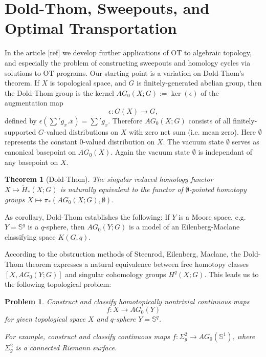 \documentclass[12pt]{amsart}
\newtheorem*{thm}{Theorem}
\newtheorem{prob}{Problem}
\theoremstyle{definition}
\theoremstyle{remark}
\begin{document}


\section{Dold-Thom, Sweepouts, and Optimal Transportation}
In the article [ref] we develop further applications of OT to algebraic topology, and especially the problem of constructing sweepouts and homology cycles via solutions to OT programs. Our starting point is a variation on Dold-Thom's theorem. If $X$ is topological space, and $G$ is finitely-generated abelian group, then the Dold-Thom group is the kernel $AG_0(X;G):=\ker(\epsilon)$ of the augmentation map $$\epsilon: G(X) \to G,$$ defined by $\epsilon(\sum' g_x .x)=\sum' g_x$. Therefore $AG_0(X;G)$ consists of all finitely-supported $G$-valued distributions on $X$ with zero net sum (i.e. mean zero). Here $\emptyset$ represents the constant $0$-valued distribution on $X$. The vacuum state $\emptyset$ serves as canonical basepoint on $AG_0(X)$. Again the vacuum state $\emptyset$ is independant of any basepoint on $X$. 

\begin{thm}[Dold-Thom]
The singular reduced homology functor $X\mapsto \tilde{H}_*(X;G)$ is naturally equivalent to the functor of $\emptyset$-pointed homotopy groups $X\mapsto \pi_*(AG_0(X;G), \emptyset)$.
\end{thm}

As corollary, Dold-Thom establishes the following: If $Y$ is a Moore space, e.g. $Y=\mathbb{S}^q$ is a $q$-sphere, then $AG_0(Y;G)$ is a model of an Eilenberg-Maclane classifying space $K(G,q)$. 

According to the obstruction methods of Steenrod, Eilenberg, Maclane, the Dold-Thom theorem expresses a natural equivalence between free homotopy classes $[X, AG_0(Y;G)]$ and singular cohomology groups $H^q(X;G)$. This leads us to the following topological problem: 

\begin{prob}
\label{dt1}
Construct and classify homotopically nontrivial continuous maps $$f: X \to AG_0(Y)$$ for given topological space $X$ and $q$-sphere $Y=\mathbb{S}^q$.

For example, construct and classify continuous maps $f: \Sigma^2_g \to AG_0(\mathbb{S}^1)$, where $\Sigma_g^2$ is a connected Riemann surface.
\end{prob}
\end{document}
